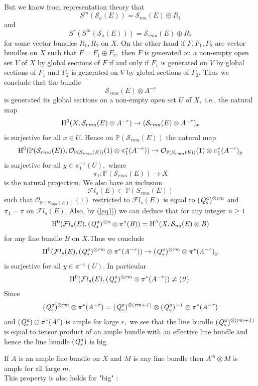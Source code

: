 \documentclass[12pt]{amsart}
\theoremstyle{definition}
\newcommand{\SSS}{{\mathcal S}}
\numberwithin{equation}{section}
\begin{document}
But we know from representation theory 
that 
$$S^m(\SSS_a(E)) = \SSS_{ma}(E)\oplus R_1$$
 and 
$$S^r(S^m(\SSS_a(E))) = \SSS_{rma}(E)\oplus R_2$$
for some vector bundles $R_1, R_2$ on $X.$
On the other hand if $F, F_1, F_2$ are vector bundles on $X$
such that $F = F_1 \oplus F_2,$ then $F$ is generated on a non-empty open set $V$ of  $X$ by global sections of $F$ if and only if 
$F_1$ is generated on $V$ by global sections of $F_1$ and
$F_2$ is generated  on $V$ by global sections of $F_2.$
Thus we conclude that the bundle 
$$\SSS_{rma}(E)\otimes A^{-r}$$
is generated its global sections on a non-empty open set $U$ of $X,$  i.e., the natural map
$${\rm H}^0(X, \SSS_{rma}(E)\otimes A^{-r}) \to (\SSS_{rma}(E)\otimes A^{-r})_x$$
is surjective for all $x \in U.$ Hence on $\mathbb{P}(\SSS_{rma}(E))$ 
the natural map 
$${\rm H}^0(\mathbb{P}(\SSS_{rma}(E)), \mathcal{O}_{\mathbb{P}(\SSS_{rma}(E))}(1)\otimes \pi_{1}^{*}(A^{-r})) \to \mathcal{O}_{\mathbb{P}(\SSS_{rma}(E))}(1)\otimes \pi_{1}^{*}(A^{-r})_y$$
is surjective for all $y \in \pi_1^{-1}(U),$ where 
$$\pi_1: \mathbb{P}(\SSS_{rma}(E)) \to X $$
is the natural projection. We also have an inclusion 
$$\mathcal {F}l_s(E)\subset \mathbb{P}(S_{rma}(E))$$
such that $\mathcal{O}_{\mathbb{P}(S_{rma}(E))}(1)$
restricted to $\mathcal {F}l_s(E)$ is equal to $(\it Q_s^a)^{\otimes rm}$ and $\pi_1 = \pi$ on $\mathcal {F}l_s(E).$ Also, by (\ref{eq1})
we can deduce that for any integer $n\geq 1$
$${\rm H}^0(\mathcal {F}l_s(E), (\it Q_s^a)^{\otimes n}\otimes \pi^{*}(B)) = {\rm H}^0(X, \SSS_{na}(E)\otimes B)$$
for any line bundle $B$ on $X.$Thus we conclude 
$${\rm H}^0(\mathcal {F}l_s(E), (\it Q_s^a)^{\otimes rm}\otimes \pi^{*}(A^{-r})) \to (\it Q_s^a)^{\otimes rm}\otimes \pi^{*}(A^{-r})_y $$
is surjective for all $y \in \pi^{-1}(U).$ In particular 
$${\rm H}^0(\mathcal {F}l_s(E), (\it Q_s^a)^{\otimes rm}\otimes \pi^{*}(A^{-r})) \neq (0).$$
Since
$$(\it Q_s^a)^{\otimes rm}\otimes \pi^{*}(A^{-r})
= (\it Q_s^a)^{\otimes (rm+1)}\otimes (\it Q_s^a)^{-1} \otimes \pi^{*}(A^{-r})$$
and 
 $(\it Q_s^a)\otimes \pi^{*}(A^{r})$ is ample for large $r,$
we see that the line bundle $(\it Q_s^a)^{\otimes (rm+1)}$ is equal to tensor product of an ample
bundle with an effective line bundle and hence the line bundle $(\it Q_s^a)$
is big.
\bigskip

If $A$ is an ample line bundle on $X$ and $M$ is any line bundle  then $A^m\otimes M$ is ample for all large $m.$ \\

This property is also holds for "big" :
\end{document}
